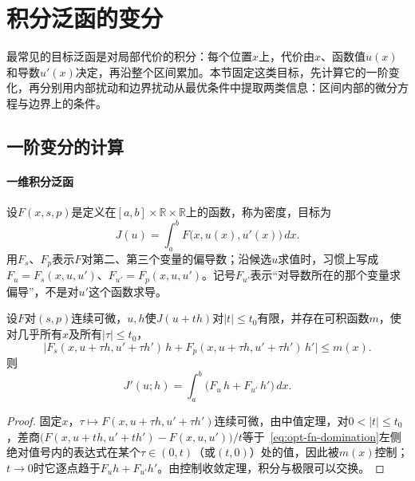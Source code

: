 
\section{积分泛函的变分}
\label{sec:opt-fn-integral}

最常见的目标泛函是对局部代价的积分：每个位置$x$上，代价由$x$、函数值$u(x)$和导数$u'(x)$决定，再沿整个区间累加。本节固定这类目标，先计算它的一阶变化，再分别用内部扰动和边界扰动从最优条件中提取两类信息：区间内部的微分方程与边界上的条件。

\subsection{一阶变分的计算}
\label{sec:opt-fn-first-variation}

\paragraph{一维积分泛函}
设$F(x,s,p)$是定义在$[a,b]\times\mathbb R\times\mathbb R$上的函数，称为密度，目标为
\begin{equation}
 J(u)=\int_a^bF\bigl(x,u(x),u'(x)\bigr)\,dx .
 \label{eq:opt-fn-integral-functional}
\end{equation}
用$F_s$、$F_p$表示$F$对第二、第三个变量的偏导数；沿候选$u$求值时，习惯上写成$F_u=F_s(x,u,u')$、$F_{u'}=F_p(x,u,u')$。记号$F_{u'}$表示“对导数所在的那个变量求偏导”，不是对$u'$这个函数求导。

\begin{theorem}[积分泛函的方向导数]
\label{thm:opt-fn-first-variation}
设$F$对$(s,p)$连续可微，$u,h$使$J(u+th)$对$|t|\le t_0$有限，并存在可积函数$m$，使对几乎所有$x$及所有$|\tau|\le t_0$，
\begin{equation}
 \bigl|F_s(x,u+\tau h,u'+\tau h')\,h+F_p(x,u+\tau h,u'+\tau h')\,h'\bigr|\le m(x) .
 \label{eq:opt-fn-domination}
\end{equation}
则
\begin{equation}
 J'(u;h)=\int_a^b\bigl(F_u\,h+F_{u'}\,h'\bigr)\,dx .
 \label{eq:opt-fn-first-variation}
\end{equation}
\end{theorem}

\begin{proof}
固定$x$，$\tau\mapsto F(x,u+\tau h,u'+\tau h')$连续可微，由中值定理，对$0<|t|\le t_0$，差商$\bigl(F(x,u+th,u'+th')-F(x,u,u')\bigr)/t$等于~\eqref{eq:opt-fn-domination}左侧绝对值号内的表达式在某个$\tau\in(0,t)$（或$(t,0)$）处的值，因此被$m(x)$控制；$t\to0$时它逐点趋于$F_uh+F_{u'}h'$。由控制收敛定理，积分与极限可以交换。
\end{proof}

